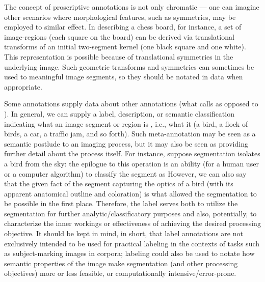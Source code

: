{\begin{description}
The concept of proscriptive annotations is not 
only chromatic --- one can imagine other scenarios 
where morphological features, such as symmetries, 
may be employed to similar effect.  In describing 
a chess board, for instance, a set of image-regions 
(each square on the board) can be derived 
via translational transforms of an initial 
two-segment kernel (one black square and one white).  
This representation is possible because of 
translational symmetries in the underlying image.  
Such geometric transforms and symmetries can 
sometimes be used to  meaningful 
image segments, so they should be notated 
in \AXFI{} data when appropriate.  

\item[Semantic Labels]  Some annotations supply data 
about other annotations (what \AIM{} calls 
 as opposed to 
).  In general, we 
can supply a label, description, or semantic 
classification indicating what an image segment 
or region is , i.e., what it  
(a bird, a flock of birds, a car, a traffic 
jam, and so forth).  Such meta-annotation may be 
seen as a semantic postlude to an imaging  
process, but it may also be seen as providing further 
detail about the process itself.  For instance, 
suppose segmentation isolates a bird from the 
sky: the epilogue to this operation is an ability 
(for a human user or a computer algorithm) to 
classify the segment as   However, we 
can also say that the given fact of the segment 
capturing the optics of a bird (with its apparent 
anatomical outline and coloration) is what 
allowed the segmentation to be possible in the 
first place.  Therefore, the label  
serves both to utilize the segmentation for 
further analytic/classificatory purposes and 
also, potentially, to characterize the 
inner workings or effectiveness of 
achieving the desired processing objective.  
It should be kept in mind, in short, that 
label annotations are not exclusively 
intended to be used for practical labeling 
in the contexts of tasks such as subject-marking 
images in corpora; labeling could also 
be used to notate how semantic properties 
of the image make segmentation (and other 
processing objectives) more or less 
feasible, or computationally intensive/error-prone. 


\end{description}}
